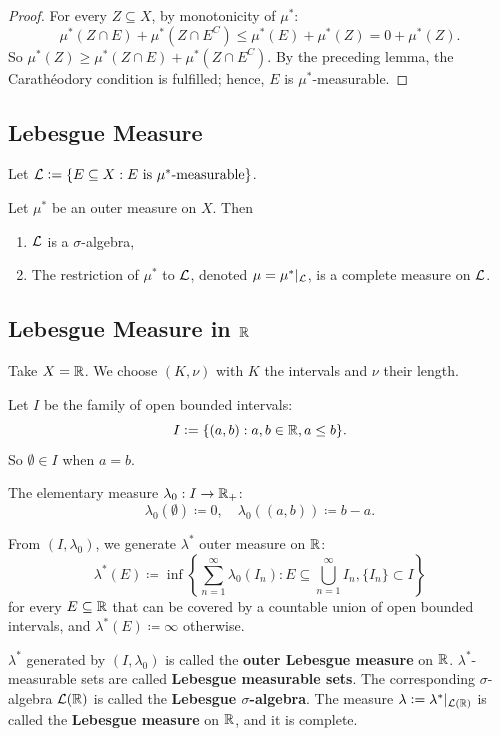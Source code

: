 \begin{proof}
For every $Z \subseteq X$, by monotonicity of $\mu^*$:
\[
\mu^*(Z \cap E) + \mu^*(Z \cap E^C) \leq \mu^*(E) + \mu^*(Z) = 0 + \mu^*(Z).
\]
So $\mu^*(Z) \geq \mu^*(Z \cap E) + \mu^*(Z \cap E^C)$. By the preceding lemma, the Carathéodory condition is fulfilled; hence, $E$ is $\mu^*$-measurable.
\end{proof}


\subsection{Lebesgue Measure}
Let $\mathcal{L} \mathrel{\mathop:}= \{E \subseteq X : E \text{ is } \mu^*\text{-measurable}\}$.

\begin{theorem}
Let $\mu^*$ be an outer measure on $X$. Then
\begin{enumerate}
    \item $\mathcal{L}$ is a $\sigma$-algebra,
    \item The restriction of $\mu^*$ to $\mathcal{L}$, denoted $\mu = \mu^*|_{\mathcal{L}}$, is a complete measure on $\mathcal{L}$.
\end{enumerate}
\end{theorem}

\subsection{Lebesgue Measure in $\mathbb{R}$}
Take $X = \mathbb{R}$. We choose $(K, \nu)$ with $K$ the intervals and $\nu$ their length.

Let $I$ be the family of open bounded intervals:
\[
I \mathrel{\mathop:}= \{(a,b) : a,b \in \mathbb{R}, a \leq b\}.
\]
So $\emptyset \in I$ when $a = b$.

The elementary measure $\lambda_0: I \to \mathbb{R}_+$:
\[
\lambda_0(\emptyset) \coloneqq 0, \quad \lambda_0((a,b)) \coloneqq b - a.
\]

From $(I, \lambda_0)$, we generate $\lambda^*$ outer measure on $\mathbb{R}$:
\[
\lambda^*(E) \coloneqq \inf\left\{\sum_{n=1}^{\infty} \lambda_0(I_n) : E \subseteq \bigcup_{n=1}^{\infty} I_n, \{I_n\} \subset I\right\}
\]
for every $E \subseteq \mathbb{R}$ that can be covered by a countable union of open bounded intervals, and $\lambda^*(E) \coloneqq \infty$ otherwise.

\begin{definition}
$\lambda^*$ generated by $(I, \lambda_0)$ is called the \textbf{outer Lebesgue measure} on $\mathbb{R}$.
$\lambda^*$-measurable sets are called \textbf{Lebesgue measurable sets}.
The corresponding $\sigma$-algebra $\mathcal{L}(\mathbb{R})$ is called the \textbf{Lebesgue $\sigma$-algebra}.
The measure $\lambda \mathrel{\mathop:}= \lambda^*|_{\mathcal{L}(\mathbb{R})}$ is called the \textbf{Lebesgue measure} on $\mathbb{R}$, and it is complete.
\end{definition}

